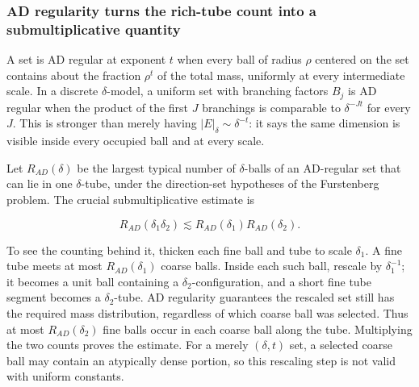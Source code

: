 \subsubsection{AD regularity turns the rich-tube count into a submultiplicative quantity}\label{04-visual-computing-ii-ch033-ad-regularity-turns-the-rich-tube-count-into-a-submultiplicative-quantity}

A set is AD regular at exponent \(t\) when every ball of radius \(\rho\) centered on the set contains about the fraction \(\rho^t\) of the total mass, uniformly at every intermediate scale. In a discrete \(\delta\)-model, a uniform set with branching factors \(B_j\) is AD regular when the product of the first \(J\) branchings is comparable to \(\delta^{-Jt}\) for every \(J\). This is stronger than merely having \(|E|_\delta\sim\delta^{-t}\): it says the same dimension is visible inside every occupied ball and at every scale.

Let \(R_{AD}(\delta)\) be the largest typical number of \(\delta\)-balls of an AD-regular set that can lie in one \(\delta\)-tube, under the direction-set hypotheses of the Furstenberg problem. The crucial submultiplicative estimate is

\[R_{AD}(\delta_1\delta_2)\lesssim R_{AD}(\delta_1)R_{AD}(\delta_2).\]

To see the counting behind it, thicken each fine ball and tube to scale \(\delta_1\). A fine tube meets at most \(R_{AD}(\delta_1)\) coarse balls. Inside each such ball, rescale by \(\delta_1^{-1}\); it becomes a unit ball containing a \(\delta_2\)-configuration, and a short fine tube segment becomes a \(\delta_2\)-tube. AD regularity guarantees the rescaled set still has the required mass distribution, regardless of which coarse ball was selected. Thus at most \(R_{AD}(\delta_2)\) fine balls occur in each coarse ball along the tube. Multiplying the two counts proves the estimate. For a merely \((\delta,t)\) set, a selected coarse ball may contain an atypically dense portion, so this rescaling step is not valid with uniform constants.

